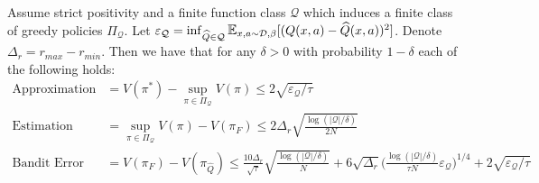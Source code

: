 \begin{theorem}\label{thm:val-small}
Assume strict positivity and a finite function class $ \mathcal{Q}$ which induces a finite class of greedy policies $ \Pi_\mathcal{Q}$. Let $ \varepsilon_\mathcal{Q} = \inf_{\widehat Q\in \mathcal{Q}}\E_{x,a\sim \mathcal{D}, \beta}[(Q(x,a) - \widehat Q(x,a))^2]$. Denote $ \Delta_r = r_{max} - r_{min}$. Then we have that for any $ \delta > 0$ with probability $ 1- \delta$ each of the following holds:
\begin{align}
    \text{Approximation Error} &= V(\pi^*) - \sup_{\pi\in \Pi_{\mathcal{Q}}}V(\pi) \leq 2\sqrt{\varepsilon_{\mathcal{Q}}/ \tau}\\
    \text{Estimation Error}  &= \sup_{\pi\in \Pi_{\mathcal{Q}}}V(\pi) - V(\pi_F) \leq 2\Delta_r \sqrt{\frac{\log(|\mathcal{Q}|/\delta)}{2N}}\\
    \text{Bandit Error}  &= V(\pi_F) - V(\pi_{\widehat Q}) \leq \frac{10\Delta_r}{\sqrt{\tau}} \sqrt{\frac{\log(|\mathcal{Q}|/\delta)}{N}} + 6\sqrt{\Delta_r} \bigg(\frac{\log(|\mathcal{Q}|/\delta)}{\tau N} \varepsilon_{\mathcal{Q}}\bigg)^{1/4} + 2\sqrt{\varepsilon_{\mathcal{Q}}/ \tau}
\end{align}
\end{theorem}

